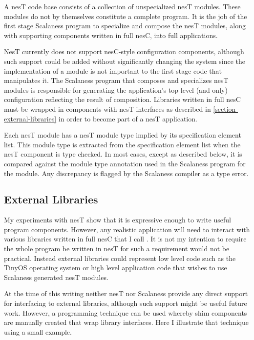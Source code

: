 A nesT code base consists of a collection of unspecialized nesT modules. These modules do not by
themselves constitute a complete program. It is the job of the first stage Scalaness program to
specialize and compose the nesT modules, along with supporting components written in full nesC,
into full applications.

NesT currently does not support nesC-style configuration components, although such support could
be added without significantly changing the system since the implementation of a module is not
important to the first stage code that manipulates it. The Scalaness program that composes and
specializes nesT modules is responsible for generating the application's top level (and only)
configuration reflecting the result of composition. Libraries written in full nesC must be
wrapped in components with nesT interfaces as described in \autoref{section-external-libraries}
in order to become part of a nesT application.

Each nesT module has a nesT module type implied by its specification element list. This module
type is extracted from the specification element list when the nesT component is type checked.
In most cases, except as described below, it is compared against the module type annotation used
in the Scalaness program for the module. Any discrepancy is flagged by the Scalaness compiler as
a type error.

\subsection{External Libraries}
\label{section-external-libraries}

My experiments with nesT show that it is expressive enough to write useful program components.
However, any realistic application will need to interact with various libraries written in full
nesC that I call . It is not my intention to require the whole
program be written in nesT for such a requirement would not be practical. Instead external
libraries could represent low level code such as the TinyOS operating system or high level
application code that wishes to use Scalaness generated nesT modules.

At the time of this writing neither nesT nor Scalaness provide any direct support for
interfacing to external libraries, although such support might be useful future work. However, a
programming technique can be used whereby shim components are manually created that wrap library
interfaces. Here I illustrate that technique using a small example.

